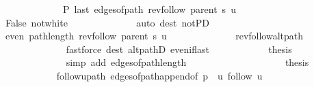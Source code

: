\begin{isabellebody}
\ \ \ \ \ \ \ \ \ \ \ \ {\isachardoublequoteopen}{\isasymnot}\ P{\isacharprime}{\kern0pt}{\isacharprime}{\kern0pt}\ {\isacharparenleft}{\kern0pt}last\ {\isacharparenleft}{\kern0pt}edges{\isacharunderscore}{\kern0pt}of{\isacharunderscore}{\kern0pt}path\ {\isacharparenleft}{\kern0pt}rev{\isacharunderscore}{\kern0pt}follow\ {\isacharparenleft}{\kern0pt}parent\ s{\isacharparenright}{\kern0pt}\ u{\isacharparenright}{\kern0pt}{\isacharparenright}{\kern0pt}{\isacharparenright}{\kern0pt}{\isachardoublequoteclose}\isanewline
\ \ \ \ \ \ \ \ \ \ \ \ \isamarkupfalse%
\ False\ not{\isacharunderscore}{\kern0pt}white\isanewline
\ \ \ \ \ \ \ \ \ \ \ \ \isamarkupfalse%
\ {\isacharparenleft}{\kern0pt}auto\ dest{\isacharcolon}{\kern0pt}\ not{\isacharunderscore}{\kern0pt}P{\isacharprime}{\kern0pt}D{\isacharparenright}{\kern0pt}\isanewline
\ \ \ \ \ \ \ \ \ \ \isamarkupfalse%
\ {\isachardoublequoteopen}even\ {\isacharparenleft}{\kern0pt}path{\isacharunderscore}{\kern0pt}length\ {\isacharparenleft}{\kern0pt}rev{\isacharunderscore}{\kern0pt}follow\ {\isacharparenleft}{\kern0pt}parent\ s{\isacharparenright}{\kern0pt}\ u{\isacharparenright}{\kern0pt}{\isacharparenright}{\kern0pt}{\isachardoublequoteclose}\isanewline
\ \ \ \ \ \ \ \ \ \ \ \ \isamarkupfalse%
\ rev{\isacharunderscore}{\kern0pt}follow{\isacharunderscore}{\kern0pt}alt{\isacharunderscore}{\kern0pt}path\isanewline
\ \ \ \ \ \ \ \ \ \ \ \ \isamarkupfalse%
\ {\isacharparenleft}{\kern0pt}fastforce\ dest{\isacharcolon}{\kern0pt}\ alt{\isacharunderscore}{\kern0pt}pathD{\isacharparenleft}{\kern0pt}{}{\isacharparenright}{\kern0pt}\ even{\isacharunderscore}{\kern0pt}if{\isacharunderscore}{\kern0pt}last{\isacharparenright}{\kern0pt}\isanewline
\ \ \ \ \ \ \ \ \ \ \isamarkupfalse%
\ {\isacharquery}{\kern0pt}thesis\isanewline
\ \ \ \ \ \ \ \ \ \ \ \ \isamarkupfalse%
\ {\isacharparenleft}{\kern0pt}simp\ add{\isacharcolon}{\kern0pt}\ edges{\isacharunderscore}{\kern0pt}of{\isacharunderscore}{\kern0pt}path{\isacharunderscore}{\kern0pt}length{\isacharparenright}{\kern0pt}\isanewline
\ \ \ \ \ \ \ \ \isamarkupfalse%
\isanewline
\ \ \ \ \ \ \ \ \isamarkupfalse%
\ \isamarkupfalse%
\ {\isacharquery}{\kern0pt}thesis\isanewline
\ \ \ \ \ \ \ \ \ \ \isamarkupfalse%
\ follow{\isacharunderscore}{\kern0pt}u{\isacharunderscore}{\kern0pt}path\ edges{\isacharunderscore}{\kern0pt}of{\isacharunderscore}{\kern0pt}path{\isacharunderscore}{\kern0pt}append{\isacharunderscore}{\kern0pt}{}{\isacharbrackleft}{\kern0pt}of\ {\isachardoublequoteopen}p\ {\isacharat}{\kern0pt}\ {\isacharbrackleft}{\kern0pt}u{\isacharbrackright}{\kern0pt}{\isachardoublequoteclose}\ {\isachardoublequoteopen}follow\ u{\isachardoublequoteclose}{\isacharbrackright}{\kern0pt}\isanewline

\end{isabellebody}
